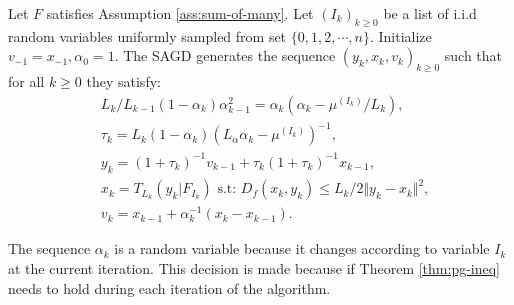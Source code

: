 \documentclass[12pt]{article}
\begin{document}
        \begin{definition}[SNAPG]\label{def:snapg}
            Let $F$ satisfies Assumption \ref{ass:sum-of-many}. 
            Let $(I_k)_{k \ge 0}$ be a list of i.i.d random variables uniformly sampled from set $\{0, 1, 2, \cdots, n\}$. 
            Initialize $v_{-1} = x_{-1}, \alpha_0 = 1$. 
            The SAGD generates the sequence $(y_k, x_k, v_k)_{k \ge 0}$ such that for all $k \ge 0$ they satisfy: 
            \begin{align*}
                & L_k/L_{k - 1}(1 - \alpha_{k})\alpha_{k - 1}^2 = \alpha_{k}\left(\alpha_{k} - \mu^{(I_k)}/L_k\right), \\
                & \tau_k = L_k(1 - \alpha_k)\left(L_\alpha \alpha_k - \mu^{(I_k)}\right)^{-1}, \\
                & y_k = (1 + \tau_k)^{-1}v_{k - 1} + \tau_k(1 + \tau_k)^{-1}x_{k - 1}, \\
                & x_k =  T_{L_k}(y_k | F_{I_k}) \text{ s.t: } D_f(x_k, y_k) \le L_k/2\Vert y_k - x_k\Vert^2, \\
                & v_k = x_{k - 1} + \alpha_k^{-1}(x_k - x_{k - 1}). 
            \end{align*}
        \end{definition}
        \begin{remark}
            The sequence $\alpha_k$ is a random variable because it changes according to variable $I_k$ at the current iteration.
            This decision is made because if Theorem \ref{thm:pg-ineq} needs to hold during each iteration of the algorithm.
        \end{remark}

        \begin{theorem}\label{thm:snapg-one-step}
            
        \end{theorem}


    



\end{document}

